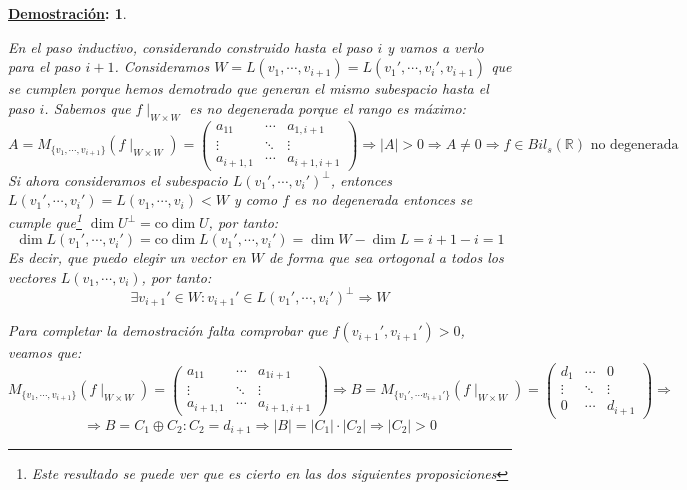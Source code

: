 \documentclass[10pt,a4paper,openright]{book}
\theoremstyle{break}
\newtheorem*{demo}{\underline{Demostración}:}
\begin{document}
\begin{demo}
\begin{itemize}
En el paso inductivo, considerando construido hasta el paso $i$ y vamos a verlo para el paso $i+1$. Consideramos $W=L(v_1, \cdots, v_{i+1}) = L(v_1', \cdots, v_i', v_{i+1})$ que se cumplen porque hemos demotrado que generan el mismo subespacio hasta el paso $i$. Sabemos que $f\mid_{W\times W}$ es no degenerada porque el rango es máximo:
$$A = M_{\{v_1, \cdots, v_{i+1}\}}(f\mid_{W\times W}) = \begin{pmatrix} a_{11} & \cdots & a_{1,i+1} \\ \vdots & \ddots & \vdots \\ a_{i+1,1} & \cdots & a_{i+1,i+1}\end{pmatrix}\Rightarrow |A| > 0 \Rightarrow A\neq 0\Rightarrow f\in Bil_s(\mathbb R)\mbox{ no degenerada}$$
Si ahora consideramos el subespacio $L(v_1', \cdots, v_i')^\perp$, entonces $L(v_1', \cdots , v_i') = L(v_1, \cdots, v_i)<W$ y como $f$ es no degenerada entonces se cumple que\footnote{Este resultado se puede ver que es cierto en las dos siguientes proposiciones} $\dim U^\perp = \mbox{co}\dim U$, por tanto:
$$\dim L(v_1', \cdots, v_i') = \mbox{co}\dim L(v_1', \cdots, v_i') = \dim W - \dim L = i+1-i = 1$$
Es decir, que puedo elegir un vector en $W$ de forma que sea ortogonal a todos los vectores $L(v_1, \cdots, v_i)$, por tanto:
$$\exists v_{i+1}'\in W: v_{i+1}'\in L(v_1', \cdots, v_i')^\perp\Rightarrow W$$

Para completar la demostración falta comprobar que $f(v_{i+1}',v_{i+1}')>0$, veamos que:
$$M_{\{v_1, \cdots, v_{i+1}\}}(f\mid_{W\times W}) = \begin{pmatrix} a_{11} & \cdots & a_{1i+1} \\ \vdots & \ddots & \vdots \\ a_{i+1,1} & \cdots & a_{i+1,i+1}\end{pmatrix}\Rightarrow B= M_{\{v_1', \cdots v_{i+1}'\}}(f\mid_{W\times W})=\begin{pmatrix} d_1 & \cdots & 0 \\ \vdots & \ddots & \vdots \\ 0 & \cdots & d_{i+1}\end{pmatrix}\Rightarrow$$
$$\Rightarrow B=C_1\oplus C_2: C_2 = d_{i+1}\Rightarrow |B| = |C_1| \cdot |C_2|\Rightarrow |C_2|>0$$
\end{itemize}
\end{demo}
\end{document}

